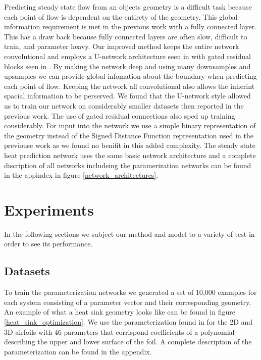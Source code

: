 \documentclass{article} %
\begin{document}
Predicting steady state flow from an objects geometry is a difficult task because each point of flow is dependent on the entirety of the geometry. This global information requirement is met in the previous work \citep{guo2016convolutional} with a fully connected layer. This has a draw back because fully connected layers are often slow, difficult to train, and parameter heavy. Our improved method keeps the entire network convolutional and employs a U-network architecture seen in \citep{DBLP:journals/corr/RonnebergerFB15} with gated residual blocks seen in \citep{salimans2017pixelcnn++}. By making the network deep and using many downsamples and upsamples we can provide global infomation about the boundary when predicting each point of flow. Keeping the network all convolutional also allows the inherint spacial information to be perserved. We found that the U-network style allowed us to train our network on considerably smaller datasets then reported in the previous work. The use of gated residual connections also sped up training considerably. For input into the network we use a simple binary representation of the geometry instead of the Signed Distance Function representation used in the previouse work as we found no benifit in this added complexity. The steady state heat prediction network uses the same basic network architecture and a complete discription of all networks includeing the paramerization networks can be found in the appindex in figure \ref{network_architectures}.

\section{Experiments}

In the following sections we subject our method and model to a variety of test in order to see its performance.

\subsection{Datasets}

To train the parameterization networks we generated a set of 10,000 examples for each system consisting of a parameter vector and their corresponding geometry. An example of what a heat sink geometry looks like can be found in figure \ref{heat_sink_optimization}. We use the parameterization found in \cite{lane2009surface} for the 2D and 3D airfoils with 46 parameters that corrispond coefficients of a polynomial describing the upper and lower surface of the foil. A complete description of the parameterization can be found in the appendix.
\end{document}
